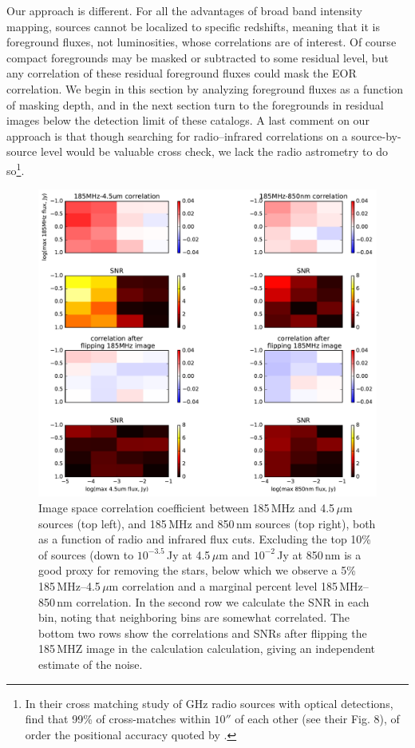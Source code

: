 \documentclass{emulateapj}
\begin{document}
Our approach is different. For all the advantages of broad band intensity mapping, sources cannot be localized to specific redshifts, meaning that it is foreground fluxes, not luminosities, whose correlations are of interest. Of course compact foregrounds may be masked or subtracted to some residual level, but any correlation of these residual foreground fluxes could mask the EOR correlation. We begin in this section by analyzing foreground fluxes as a function of masking depth, and in the next section turn to the foregrounds in residual images below the detection limit of these catalogs. A last comment on our approach is that though searching for radio--infrared correlations on a source-by-source level would be valuable cross check, we lack the radio astrometry to do so\footnote{In their cross matching study of GHz radio sources with optical detections, \citep{mcmahon02} find that 99\% of cross-matches within $10''$ of each other (see their Fig. 8), of order the positional accuracy quoted by \citet{PattiCatalog1}.}. 

\begin{figure}[h]
\centering
\includegraphics[width=5.5in]{images/source_correlation_grids_and_snrs.pdf}
\caption{Image space correlation coefficient between 185\,MHz and 4.5\,$\mu$m sources (top left), and 185\,MHz and 850\,nm sources (top right), both as a function of radio and infrared flux cuts. Excluding the top 10\% of sources (down to $10^{-3.5}$\,Jy at 4.5\,$\mu$m and $10^{-2}$\,Jy at 850\,nm is a good proxy for removing the stars, below which we observe a 5\% 185\,MHz--4.5\,$\mu$m correlation and a marginal percent level 185\,MHz--850\,nm correlation. In the second row we calculate the SNR in each bin, noting that neighboring bins are somewhat correlated. The bottom two rows show the correlations and SNRs after flipping the 185\,MHZ image in the calculation calculation, giving an independent estimate of the noise.}
\label{fig:correlationsandSNRs}
\end{figure}
\end{document}
